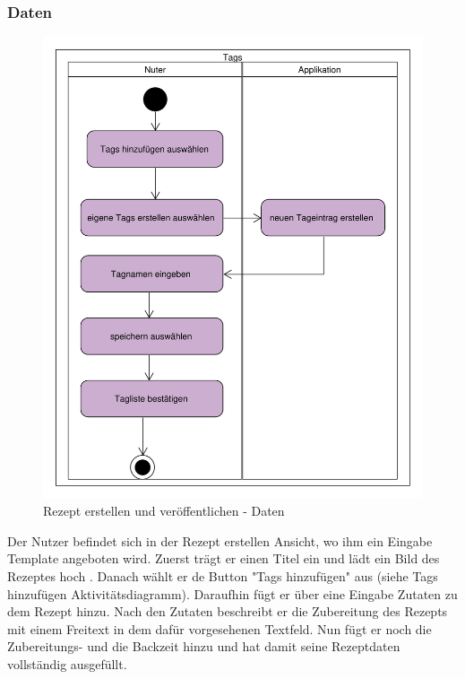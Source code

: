 \subsubsection{Daten}
\begin{figure}[H]
	\centering
	\includegraphics[width=\textwidth]{pics/dynamicDiagram/AktivitaetsdiagrammRezepterstellenDaten.pdf}%
	\caption{Rezept erstellen und veröffentlichen - Daten}%
	\label{diagram}%
\end{figure}


Der Nutzer befindet sich in der Rezept erstellen Ansicht, wo ihm ein Eingabe Template angeboten wird. Zuerst trägt er einen Titel ein und lädt ein Bild des Rezeptes hoch . Danach wählt er de Button "Tags hinzufügen" aus (siehe Tags hinzufügen Aktivitätsdiagramm). Daraufhin fügt er über eine Eingabe Zutaten zu dem Rezept hinzu. Nach den Zutaten beschreibt er die Zubereitung des Rezepts mit einem Freitext in dem dafür vorgesehenen Textfeld. Nun fügt er noch die Zubereitungs- und die Backzeit hinzu und hat damit seine Rezeptdaten vollständig ausgefüllt. 


